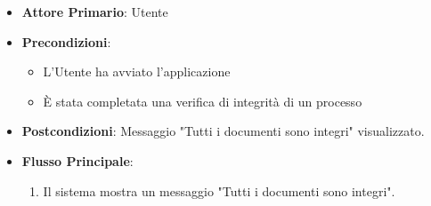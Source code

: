 \begin{itemize}
    \item \textbf{Attore Primario}: Utente
    \item \textbf{Precondizioni}: \begin{itemize}
        \item L'Utente ha avviato l'applicazione
        \item È stata completata una verifica di integrità di un processo
        \end{itemize}
    \item \textbf{Postcondizioni}: Messaggio "Tutti i documenti sono integri" visualizzato.
    \item \textbf{Flusso Principale}:
        \begin{enumerate}
            \item Il sistema mostra un messaggio "Tutti i documenti sono integri".
        \end{enumerate}
\end{itemize}

